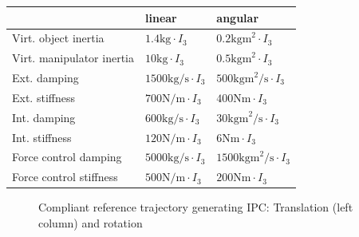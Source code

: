 \documentclass[a4paper,twoside, openright,12pt]{report}
\begin{document}
{\begin{table}
	\begin{tabular}{ l | l | l }
	 & linear & angular \\ \hline
	Virt. object inertia & $1.4 \text{kg} \cdot I_3$ & $0.2 \text{kgm}^2 \cdot I_3$ \\ \hline
	Virt. manipulator inertia & $10 \text{kg} \cdot I_3$ & $0.5 \text{kgm}^2 \cdot I_3$ \\ \hline 
	Ext. damping	 & $1500 \text{kg/s} \cdot I_3$ & $500 \text{kgm}^2 \text{/s} \cdot I_3$ \\ \hline
	Ext. stiffness & $700 \text{N/m} \cdot I_3$ & $400 \text{Nm} \cdot  I_3$ \\ \hline
	Int. damping & $600 \text{kg/s} \cdot I_3$ & $30 \text{kgm}^2 \text{/s} \cdot I_3 $ \\ \hline
	Int. stiffness & $120 \text{N/m} \cdot I_3$ & $6 \text{Nm} \cdot I_3$\\ \hline
	Force control damping & $5000 \text{kg/s} \cdot I_3$ & $1500 \text{kgm}^2 \text{/s} \cdot I_3 $ \\ \hline
	Force control stiffness & $500 \text{N/m} \cdot I_3$ & $200 \text{Nm} \cdot I_3$\\ \hline
\end{tabular}
\end{table}

\begin{figure}

\label{FIG:DIPCrSim}
\caption[Simulation results of the compliant reference trajectory generating IPC]{Compliant reference trajectory generating IPC: Translation (left column) and rotation}
\end{figure}

\clearpage
}
\end{document}
